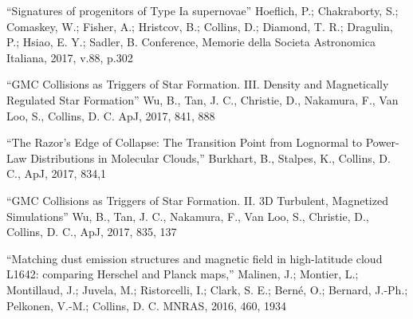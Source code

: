 \medskip
\noindent
``Signatures of progenitors of Type Ia supernovae''
Hoeflich, P.; Chakraborty, S.; Comaskey, W.; Fisher, A.; Hristcov, B.; Collins, D.; Diamond, T. R.; Dragulin, P.; Hsiao, E. Y.; Sadler, B.
Conference, Memorie della Societa Astronomica Italiana, 2017, v.88, p.302

\medskip
\noindent
``GMC Collisions as Triggers of Star Formation. III. Density and Magnetically Regulated Star Formation''
Wu, B., Tan, J. C., Christie, D., Nakamura, F., Van Loo, S., Collins, D. C. 
ApJ, 2017, 841, 888

\medskip
\noindent
``The Razor’s Edge of Collapse: The Transition Point from Lognormal to Power-Law Distributions in Molecular Clouds,'' 
Burkhart, B., Stalpes, K., Collins, D. C.,
ApJ, 2017, 834,1

\medskip
\noindent
``GMC Collisions as Triggers of Star Formation. II. 3D Turbulent, Magnetized Simulations'' 
Wu, B., Tan, J. C., Nakamura, F., Van Loo, S., Christie, D., Collins, D. C., 
ApJ, 2017, 835, 137

\medskip
\noindent
``Matching dust emission structures and magnetic field in high-latitude cloud L1642: comparing Herschel and Planck maps,''
Malinen, J.; Montier, L.; Montillaud, J.; Juvela, M.; Ristorcelli, I.; Clark, S.  E.; Bern\'e, O.; Bernard, J.-Ph.; Pelkonen, V.-M.; Collins, D. C. 
MNRAS, 2016, 460, 1934


